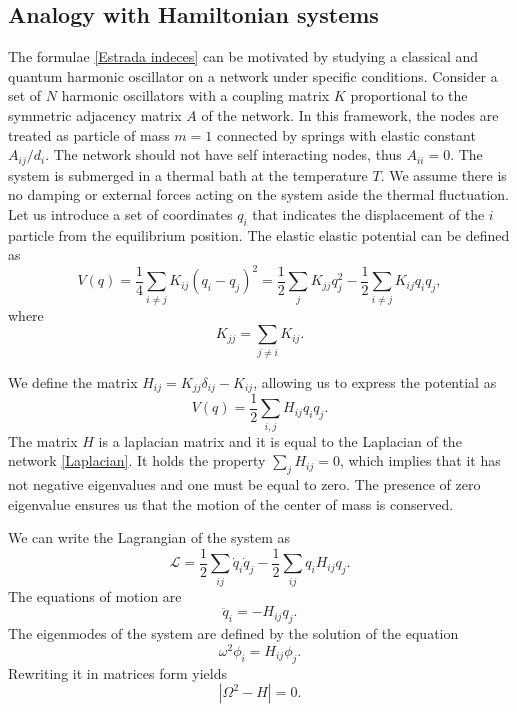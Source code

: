 
\subsection{Analogy with Hamiltonian systems}
The formulae \eqref{Estrada indeces} can be motivated by studying a classical and quantum harmonic oscillator on a network under specific conditions.
Consider a set of $N$ harmonic oscillators with a coupling matrix $K$ proportional to the symmetric adjacency matrix $A$ of the network. In this framework, the nodes are treated as particle of mass $m = 1$ connected by springs with elastic constant $A_{ij}/d_i$. The network should not have self interacting nodes, thus $A_{ii} = 0$. The system is submerged in a thermal bath at the temperature $T$. We assume there is no damping or external forces acting on the system aside the thermal fluctuation. 
Let us introduce a set of coordinates $q_i$ that indicates the displacement of the $i$ particle from the equilibrium position. The elastic elastic potential can be defined as
\begin{equation}
    V(q) = \frac{1}{4}\sum_{i\neq j} K_{ij}(q_i-q_j)^2 = \frac{1}{2}\sum_{j}K_{jj}q_j^2 - \frac{1}{2} \sum_{i\neq j}K_{ij}q_iq_j,
\end{equation}
where 
\begin{equation}
    K_{jj} = \sum_{j \neq i} K_{ij}.
\end{equation}

We define the matrix $H_{ij}= K_{jj}\delta_{ij} - K_{ij}$, allowing us to express the potential as
\begin{equation}
    V(q) = \frac{1}{2}\sum_{i,j} H_{ij} q_i q_j.
\end{equation}
The matrix $H$ is a laplacian matrix and it is equal to the Laplacian of the network \eqref{Laplacian}. It holds the property $\sum_j H_{ij} = 0$, which implies that it has not negative eigenvalues and one must be equal to zero.
The presence of zero eigenvalue ensures us that the motion of the center of mass is conserved. %

We can write the Lagrangian of the system as
\begin{equation}
    \mathcal{L} = \frac{1}{2}\sum_{ij} \dot q_i \dot q_j - \frac{1}{2} \sum_{ij} q_iH_{ij}q_j.
\end{equation}
The equations of motion are
\begin{equation}
    \ddot q_i = -H_{ij} q_j.
\end{equation}
The eigenmodes of the system are defined by the solution of the equation 
\begin{equation}
    \omega^2 \phi_i = H_{ij} \phi_j.
\end{equation}
Rewriting it in matrices form yields
\begin{equation}
    |\Omega^2 - H| = 0. %
\end{equation}

